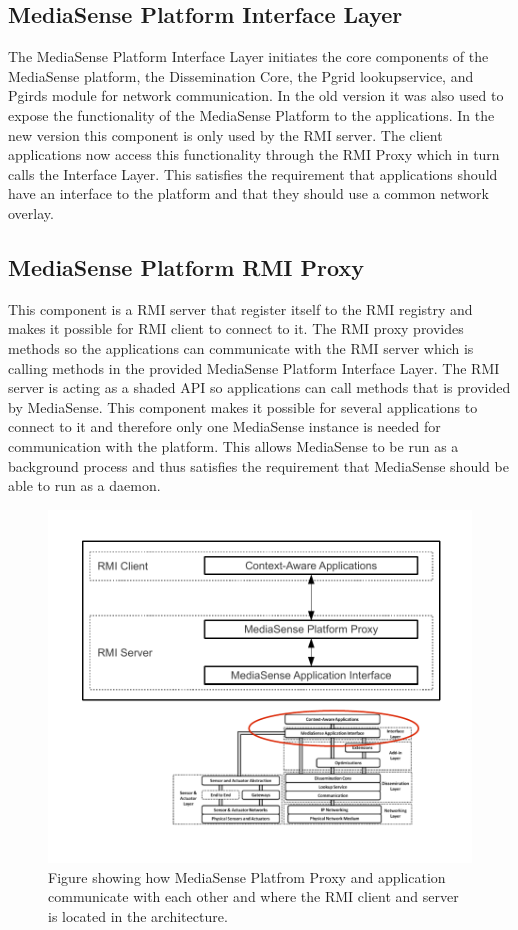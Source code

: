 \subsection{MediaSense Platform Interface Layer}
The MediaSense Platform Interface Layer initiates the core components of the MediaSense platform, the Dissemination Core, the Pgrid lookupservice, and Pgirds module for network communication. In the old version it was also used to expose the functionality of the MediaSense Platform to the applications. In the new version this component is only used by the RMI server. The client applications now access this functionality through the RMI Proxy which in turn calls the Interface Layer. This satisfies the requirement that applications should have an interface to the platform and that they should use a common network overlay.

\subsection{MediaSense Platform RMI Proxy}
This component is a RMI server that register itself to the RMI registry and makes it possible for RMI client to connect to it. The RMI proxy provides methods so the applications can communicate with the RMI server which is calling methods in the provided MediaSense Platform Interface Layer. The RMI server is acting as a shaded API so applications can call methods that is provided by MediaSense. This component makes it possible for several applications to connect to it and therefore only one MediaSense instance is needed for communication with the platform. This allows MediaSense to be run as a background process and thus satisfies the requirement that MediaSense should be able to run as a daemon.

\begin{figure}[h!]
	\centering
    	\includegraphics{part_6/artefact_description/changes.pdf}
		\caption{Figure showing how MediaSense Platfrom Proxy and application communicate with each other and where the RMI client and server is located in the architecture.} 
		\label{ds}
\end{figure}


